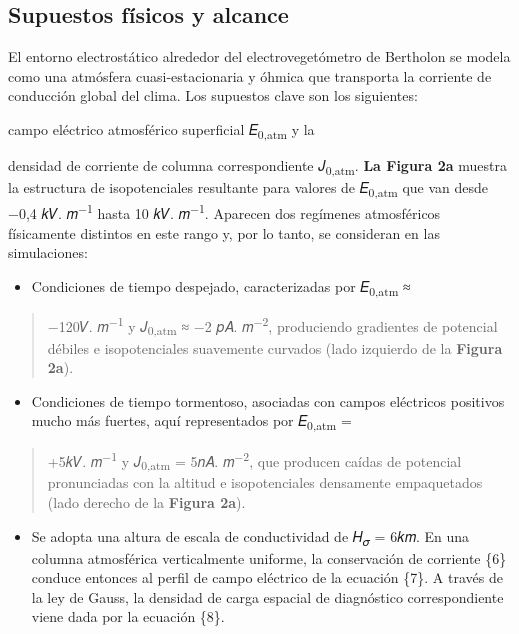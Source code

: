 \documentclass[
]{article}
\providecommand{\tightlist}{%
  \setlength{\itemsep}{0pt}\setlength{\parskip}{0pt}}
\begin{document}
\subsection{Supuestos físicos y
alcance}\label{supuestos-fuxedsicos-y-alcance}

El entorno electrostático alrededor del electrovegetómetro de Bertholon
se modela como una atmósfera cuasi-estacionaria y óhmica que transporta
la corriente de conducción global del clima. Los supuestos clave son los
siguientes:

campo eléctrico atmosférico superficial 𝐸\textsubscript{0,atm} y la

densidad de corriente de columna correspondiente 𝐽\textsubscript{0,atm}.
\textbf{La Figura 2a} muestra la estructura de isopotenciales resultante
para valores de 𝐸\textsubscript{0,atm} que van desde −0,4 𝑘𝑉.
𝑚\textsuperscript{−1} hasta 10 𝑘𝑉. 𝑚\textsuperscript{−1}. Aparecen dos
regímenes atmosféricos físicamente distintos en este rango y, por lo
tanto, se consideran en las simulaciones:

\begin{itemize}
\tightlist
\item
  Condiciones de tiempo despejado, caracterizadas por
  𝐸\textsubscript{0,atm} ≈
\end{itemize}

\begin{quote}
−120𝑉. 𝑚\textsuperscript{−1} y 𝐽\textsubscript{0,atm} ≈ −2 𝑝𝐴.
𝑚\textsuperscript{−2}, produciendo gradientes de potencial débiles e
isopotenciales suavemente curvados (lado izquierdo de la \textbf{Figura
2a}).
\end{quote}

\begin{itemize}
\tightlist
\item
  Condiciones de tiempo tormentoso, asociadas con campos eléctricos
  positivos mucho más fuertes, aquí representados por
  𝐸\textsubscript{0,atm} =
\end{itemize}

\begin{quote}
+5𝑘𝑉. 𝑚\textsuperscript{−1} y 𝐽\textsubscript{0,atm} = 5𝑛𝐴.
𝑚\textsuperscript{−2}, que producen caídas de potencial pronunciadas con
la altitud e isopotenciales densamente empaquetados (lado derecho de la
\textbf{Figura 2a}).
\end{quote}

\begin{itemize}
\tightlist
\item
  Se adopta una altura de escala de conductividad de 𝐻\textsubscript{𝜎}
  = 6𝑘𝑚. En una columna atmosférica verticalmente uniforme, la
  conservación de corriente \{6\} conduce entonces al perfil de campo
  eléctrico de la ecuación \{7\}. A través de la ley de Gauss, la
  densidad de carga espacial de diagnóstico correspondiente viene dada
  por la ecuación \{8\}.
\end{itemize}
\end{document}
